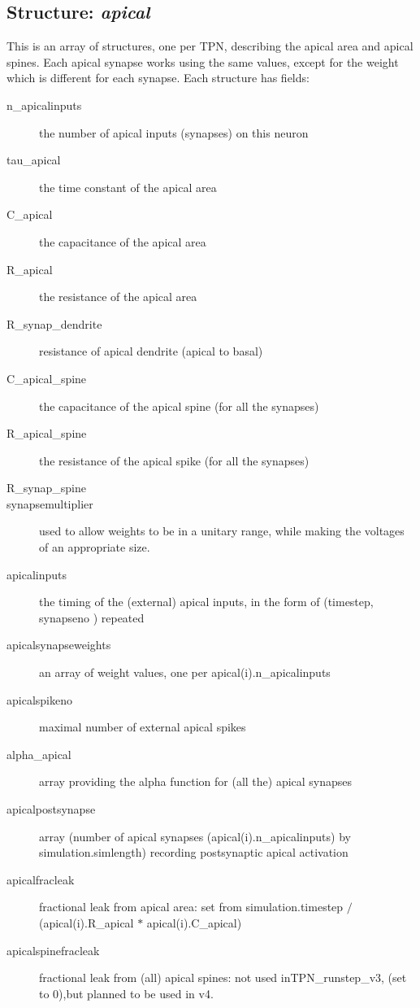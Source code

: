 \documentclass[11pt, oneside]{article}   	%
\begin{document}
\subsection{Structure: {\it apical}}
This is an array of structures, one per TPN, describing the apical area and apical spines. Each apical synapse works using the same values, except for the weight which is different for each synapse. Each structure has fields:
\begin{description}
\item[n\_apicalinputs] the number of apical inputs (synapses) on this neuron
\item[tau\_apical] the time constant of the apical area
\item[C\_apical] the capacitance of the apical area
\item[R\_apical] the resistance of the apical area
\item[R\_synap\_dendrite] resistance of apical dendrite (apical to basal)
\item[C\_apical\_spine] the capacitance of the apical spine (for all the synapses)
\item[R\_apical\_spine] the resistance of the apical spike (for all the synapses)
\item[R\_synap\_spine] 
\item[synapsemultiplier] used to allow weights to be in a unitary range, while making the voltages of an appropriate size.
\item[apicalinputs] the timing of the (external) apical inputs, in the form of (timestep, synapseno ) repeated
\item[apicalsynapseweights] an array of weight values, one per apical(i).n\_apicalinputs
\item[apicalspikeno] maximal number of external apical spikes
\item[alpha\_apical] array providing the alpha function for (all the) apical synapses
\item[apicalpostsynapse] array (number of apical synapses (apical(i).n\_apicalinputs) by simulation.simlength) recording postsynaptic apical activation
\item[apicalfracleak] fractional leak from apical area: set from simulation.timestep $/$ (apical(i).R\_apical $*$ apical(i).C\_apical)
\item[apicalspinefracleak] fractional leak from (all) apical spines: not used inTPN\_runstep\_v3, (set to 0),but planned to be used in v4.
\end{description}
\end{document}
